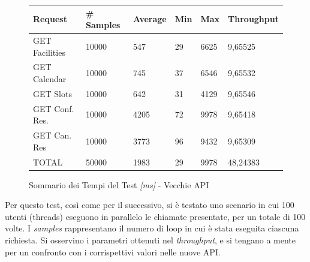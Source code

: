 \begin{figure}[H]
    \begin{table}[H]
        \centering
        \begin{tabular}{ |p{3cm}||p{2cm}|p{2cm}|p{1cm}|p{1cm}|p{2cm}| }
            \hline
            Request & \# Samples & Average  & Min & Max &  Throughput\\
            \hline
            GET Facilities      & 10000    & 547   & 29 & 6625 & 9,65525      \\
            GET Calendar        & 10000    & 745   & 37 & 6546        & 9,65532      \\
            GET Slots        & 10000    & 642   & 31 & 4129        & 9,65546      \\
            GET Conf. Res.        & 10000    & 4205    & 72 & 9978        & 9,65418      \\
            GET Can. Res        & 10000    & 3773    & 96 & 9432        & 9,65309      \\
            TOTAL        & 50000    & 1983    & 29 & 9978        & 48,24383      \\
            \hline
        \end{tabular}
    \end{table}
    \caption{Sommario dei Tempi del Test \textit{[ms]} - Vecchie API}
    \label{fig:oldapi100t_summary}
\end{figure}
Per questo test, così come per il successivo, si è testato uno scenario in cui 100 utenti (threads) eseguono in parallelo le chiamate presentate, per un totale di 100 volte. I \emph{samples} rappresentano il numero di loop in cui è stata eseguita ciascuna richiesta. Si osservino i parametri ottenuti nel \emph{throughput}, e si tengano a mente per un confronto con i corrispettivi valori nelle nuove API.

